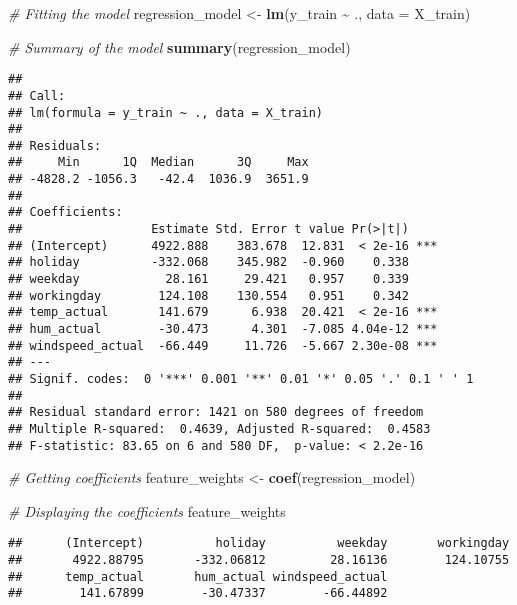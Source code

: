 \documentclass[
]{article}
\newenvironment{Shaded}{\begin{snugshade}}{\end{snugshade}}
\newcommand{\AttributeTok}[1]{\textcolor[rgb]{0.13,0.29,0.53}{#1}}
\newcommand{\CommentTok}[1]{\textcolor[rgb]{0.56,0.35,0.01}{\textit{#1}}}
\newcommand{\FunctionTok}[1]{\textcolor[rgb]{0.13,0.29,0.53}{\textbf{#1}}}
\newcommand{\NormalTok}[1]{#1}
\newcommand{\OtherTok}[1]{\textcolor[rgb]{0.56,0.35,0.01}{#1}}
\newcommand{\SpecialCharTok}[1]{\textcolor[rgb]{0.81,0.36,0.00}{\textbf{#1}}}
\begin{document}
\begin{Shaded}
\begin{Highlighting}[]
\CommentTok{\# Fitting the model}
\NormalTok{regression\_model }\OtherTok{\textless{}{-}} \FunctionTok{lm}\NormalTok{(y\_train }\SpecialCharTok{\textasciitilde{}}\NormalTok{ ., }\AttributeTok{data =}\NormalTok{ X\_train)}

\CommentTok{\# Summary of the model}
\FunctionTok{summary}\NormalTok{(regression\_model)}
\end{Highlighting}
\end{Shaded}

\begin{verbatim}
## 
## Call:
## lm(formula = y_train ~ ., data = X_train)
## 
## Residuals:
##     Min      1Q  Median      3Q     Max 
## -4828.2 -1056.3   -42.4  1036.9  3651.9 
## 
## Coefficients:
##                  Estimate Std. Error t value Pr(>|t|)    
## (Intercept)      4922.888    383.678  12.831  < 2e-16 ***
## holiday          -332.068    345.982  -0.960    0.338    
## weekday            28.161     29.421   0.957    0.339    
## workingday        124.108    130.554   0.951    0.342    
## temp_actual       141.679      6.938  20.421  < 2e-16 ***
## hum_actual        -30.473      4.301  -7.085 4.04e-12 ***
## windspeed_actual  -66.449     11.726  -5.667 2.30e-08 ***
## ---
## Signif. codes:  0 '***' 0.001 '**' 0.01 '*' 0.05 '.' 0.1 ' ' 1
## 
## Residual standard error: 1421 on 580 degrees of freedom
## Multiple R-squared:  0.4639, Adjusted R-squared:  0.4583 
## F-statistic: 83.65 on 6 and 580 DF,  p-value: < 2.2e-16
\end{verbatim}

\begin{Shaded}
\begin{Highlighting}[]
\CommentTok{\# Getting coefficients}
\NormalTok{feature\_weights }\OtherTok{\textless{}{-}} \FunctionTok{coef}\NormalTok{(regression\_model)}

\CommentTok{\# Displaying the coefficients}
\NormalTok{feature\_weights}
\end{Highlighting}
\end{Shaded}

\begin{verbatim}
##      (Intercept)          holiday          weekday       workingday 
##       4922.88795       -332.06812         28.16136        124.10755 
##      temp_actual       hum_actual windspeed_actual 
##        141.67899        -30.47337        -66.44892
\end{verbatim}
\end{document}

